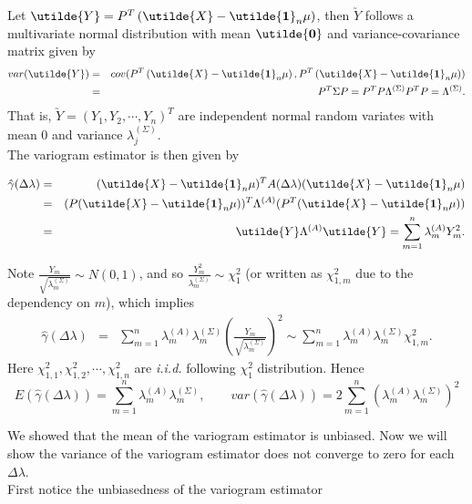 Let $\utilde{Y} = P^T\left(\utilde{X} - \utilde{\bf 1}_n \mu \right)$, then $\utilde{Y}$ follows a multivariate normal distribution with mean $\utilde{\bf 0}$ and variance-covariance matrix given by
\begin{eqnarray*}
var(\utilde{Y}) &=& cov(P^T\left(\utilde{X} - \utilde{\bf 1}_n \mu \right), P^T\left(\utilde{X} - \utilde{\bf 1}_n \mu \right)) \\
&=& P^T \Sigma P  = P^T P \Lambda^{(\Sigma)} P^T P = \Lambda^{(\Sigma)}.
\end{eqnarray*}
That is, $\utilde{Y} = (Y_1, Y_2, \cdots, Y_n)^T$ are independent normal random variates with mean 0 and variance $\lambda_j^{(\Sigma)}$. \\

The variogram estimator is then given by

\begin{eqnarray*}
\hat{\gamma}(\Delta \lambda) &=& (\utilde{X}-\utilde{\bf 1}_n\mu)^T A(\Delta \lambda)(\utilde{X}-\utilde{\bf 1}_n\mu) \\
&=& (P(\utilde{X}-\utilde{\bf 1}_n\mu))^T \Lambda^{(A)} (P^T(\utilde{X}-\utilde{\bf 1}_n\mu))  \\
&=& \utilde{Y} \Lambda^{(A)} \utilde{Y} = \sum_{m = 1}^n \lambda_m^{(A)} Y_m^2.
\end{eqnarray*}

Note $\frac{Y_m}{\sqrt{\lambda_m^{(\Sigma)}}} \sim N(0, 1)$, and so $\frac{Y_m^2}{\lambda_m^{(\Sigma)}} \sim \chi_1^2$ (or written as $\chi_{1, m}^2$ due to the dependency on $m$), which implies
\begin{eqnarray*}
\hat{\gamma}(\Delta \lambda) &=& \sum_{m = 1}^n \lambda_m^{(A)} \lambda_m^{(\Sigma)} \left(\frac{Y_m}{\sqrt{\lambda_m^{(\Sigma)}}}\right)^2 \sim \sum_{m = 1}^n \lambda_m^{(A)} \lambda_m^{(\Sigma)} \chi_{1,m}^2.
\end{eqnarray*}
Here $\chi_{1, 1}^2, \chi_{1, 2}^2, \cdots, \chi_{1, n}^2$ are {\em i.i.d.} following $\chi_1^2$ distribution. Hence
\[
E(\hat{\gamma}(\Delta \lambda)) = \sum_{m = 1}^n \lambda_m^{(A)} \lambda_m^{(\Sigma)}, \quad \quad var(\hat{\gamma}(\Delta \lambda)) = 2 \sum_{m = 1}^n (\lambda_m^{(A)} \lambda_m^{(\Sigma)})^2
\]

We showed that the mean of the variogram estimator is unbiased. Now we will show the variance of the variogram estimator does not converge to zero for each $\Delta \lambda$. \\

First notice the unbiasedness of the variogram estimator

